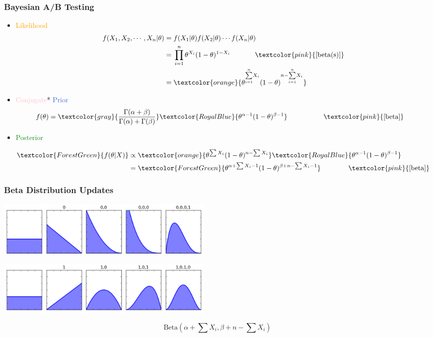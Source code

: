 \documentclass[xcolor={dvipsnames}]{beamer}
\begin{document}
\frame
{
\frametitle{Bayesian A/B Testing}

\begin{itemize}
\item \textcolor{orange}{Likelihood}
\begin{align*}   
f(X_1,X_2,\cdots,X_n|\theta) = {}& f(X_1|\theta)f(X_2|\theta) \cdots f(X_n|\theta) \\
= {}& \prod_{i=1}^n \theta^{X_i}(1-\theta)^{1-X_i} \quad\quad\quad\;\; \textcolor{pink}{\text{[beta(s)]}} \\
= {}& \textcolor{orange}{\theta^{\overset{\tiny n}{\underset{\tiny i=1}{\sum}} X_i}(1-\theta)^{n-\overset{\tiny n}{\underset{\tiny i=1}{\sum}} X_i}}
\end{align*}   

\item<2->  \textcolor{pink}{Conjugate}* \textcolor{RoyalBlue}{Prior}
\begin{align*}   
f(\theta) = {}& \textcolor{gray}{\frac{\Gamma(\alpha+\beta)}{\Gamma(\alpha)+\Gamma(\beta)}}\textcolor{RoyalBlue}{\theta^{\alpha - 1}(1-\theta)^{\beta - 1}} \quad\quad\quad\quad\quad\; \textcolor{pink}{\text{[beta]}}
\end{align*}   

\item <3-> \textcolor{ForestGreen}{Posterior}

\begin{align*}   
\textcolor{ForestGreen}{f(\theta|X)} \propto {}& \textcolor{orange}{\theta^{\sum X_i}(1-\theta)^{n-\sum X_i}}\textcolor{RoyalBlue}{\theta^{\alpha - 1}(1-\theta)^{\beta - 1}} \\
= {}& \textcolor{ForestGreen}{\theta^{\alpha + \sum X_i - 1}(1-\theta)^{\beta + n-\sum X_i - 1}} \quad\quad\quad\quad \textcolor{pink}{\text{[beta]}}
\end{align*}   


\end{itemize}
}


\frame
{
\frametitle{Beta Distribution Updates}
\includegraphics[width=4.2in]{stuff/beta_updates.png}

\includegraphics[width=4.2in]{stuff/beta_updates1.png}

\huge
$$\text{Beta}\left(\alpha + \sum X_i, \beta + n-\sum X_i\right)$$
}
\end{document}
